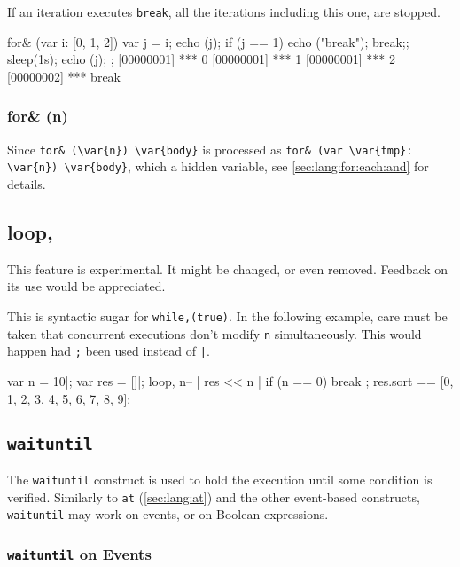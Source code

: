 If an iteration executes \lstinline|break|, all the iterations
including this one, are stopped.

\begin{urbiscript}
for& (var i: [0, 1, 2])
{
  var j = i;
  echo (j);
  if (j == 1)
   { echo ("break");
    break;};
  sleep(1s);
  echo (j);
};
[00000001] *** 0
[00000001] *** 1
[00000001] *** 2
[00000002] *** break
\end{urbiscript}

\subsubsection{for\& (n)}

Since \lstinline|for& (\var{n}) \var{body}| is processed as
\lstinline|for& (var \var{tmp}: \var{n}) \var{body}|, which 
a hidden variable, see \autoref{sec:lang:for:each:and} for details.


\subsection{loop,}
\begin{note}
  This feature is experimental.  It might be changed, or even removed.
  Feedback on its use would be appreciated.
\end{note}

This is syntactic sugar for \lstinline|while,(true)|.  In the
following example, care must be taken that concurrent executions don't
modify \lstinline|n| simultaneously.  This would happen had
\lstinline|;| been used instead of \lstinline'|'.

\begin{urbiassert}
{
  var n = 10|;
  var res = []|;
  loop,
  {
    n-- |
    res << n |
    if (n == 0)
      break
  };
  res.sort
}
==
[0, 1, 2, 3, 4, 5, 6, 7, 8, 9];
\end{urbiassert}

\subsection{\lstinline|waituntil|}
\label{sec:lang:waituntil}

The \lstinline|waituntil| construct is used to hold the execution
until some condition is verified.  Similarly to \lstinline|at|
(\autoref{sec:lang:at}) and the other event-based constructs,
\lstinline|waituntil| may work on events, or on Boolean expressions.

\subsubsection{\lstinline'waituntil' on Events}

